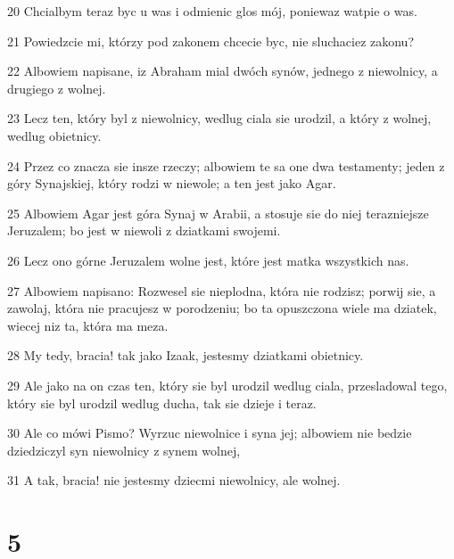 \par 20 Chcialbym teraz byc u was i odmienic glos mój, poniewaz watpie o was.
\par 21 Powiedzcie mi, którzy pod zakonem chcecie byc, nie sluchaciez zakonu?
\par 22 Albowiem napisane, iz Abraham mial dwóch synów, jednego z niewolnicy, a drugiego z wolnej.
\par 23 Lecz ten, który byl z niewolnicy, wedlug ciala sie urodzil, a który z wolnej, wedlug obietnicy.
\par 24 Przez co znacza sie insze rzeczy; albowiem te sa one dwa testamenty; jeden z góry Synajskiej, który rodzi w niewole; a ten jest jako Agar.
\par 25 Albowiem Agar jest góra Synaj w Arabii, a stosuje sie do niej terazniejsze Jeruzalem; bo jest w niewoli z dziatkami swojemi.
\par 26 Lecz ono górne Jeruzalem wolne jest, które jest matka wszystkich nas.
\par 27 Albowiem napisano: Rozwesel sie nieplodna, która nie rodzisz; porwij sie, a zawolaj, która nie pracujesz w porodzeniu; bo ta opuszczona wiele ma dziatek, wiecej niz ta, która ma meza.
\par 28 My tedy, bracia! tak jako Izaak, jestesmy dziatkami obietnicy.
\par 29 Ale jako na on czas ten, który sie byl urodzil wedlug ciala, przesladowal tego, który sie byl urodzil wedlug ducha, tak sie dzieje i teraz.
\par 30 Ale co mówi Pismo? Wyrzuc niewolnice i syna jej; albowiem nie bedzie dziedziczyl syn niewolnicy z synem wolnej,
\par 31 A tak, bracia! nie jestesmy dziecmi niewolnicy, ale wolnej.

\chapter{5}

